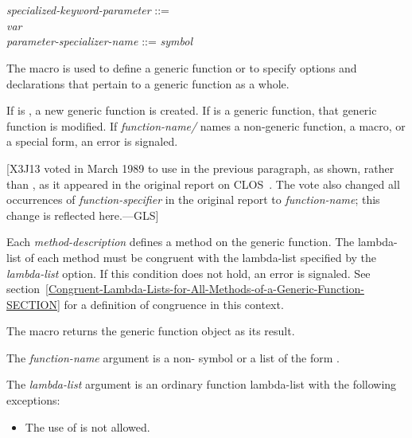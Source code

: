\begin{defmac}
\begin{tabbing}
\> \\
\>\cd{)} \poptabs \\[2pt]
{\it specialized-keyword-parameter\/} ::= \\
\hskip 2pc {\it var} {\Mor} \cd{(}
       \cd{)} \\[2pt]
{\it parameter-specializer-name\/} ::= {\it symbol} {\Mor} 
\end{tabbing}
The macro  is used to define a generic function or to
specify options and declarations that pertain to a generic function as
a whole.

If  is , a new
generic function is created.  If  is a generic function, that generic function
is modified.  If {\it function-name/} names a non-generic
function, a macro, or a special form, an error is signaled.

[X3J13 voted in March 1989  to use 
in the previous paragraph, as shown, rather than ,
as it appeared in the original report on CLOS~\cite{SIGPLAN-CLOS,LASC-CLOS-PART-2}.
The vote also changed all occurrences of {\it function-specifier} in the
original report to {\it function-name}; this change is reflected here.---GLS]

Each {\it method-description\/} defines a method on the generic function.
The lambda-list of each method must be congruent with the lambda-list
specified by the {\it lambda-list\/} option.  If this condition
does not hold, an error is signaled.
See section~\ref{Congruent-Lambda-Lists-for-All-Methods-of-a-Generic-Function-SECTION}
for a definition
of congruence in this context.

The macro  returns the generic function object 
as its result.




The {\it function-name} argument is a non- symbol or a
list of the form .


The {\it lambda-list\/} argument is an ordinary function lambda-list
with the following exceptions:

\begin{itemize}
\item 
The use of  is not allowed. 


\end{itemize}
\end{defmac}
